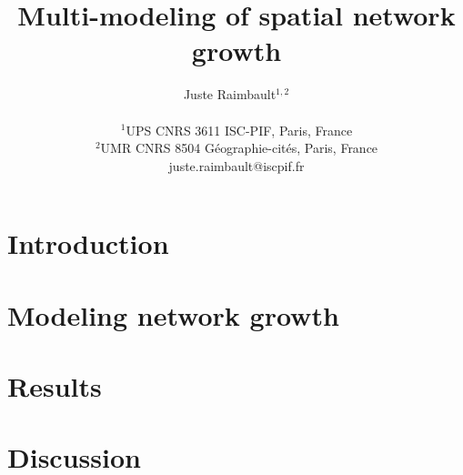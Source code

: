 \documentclass[letterpaper]{article}
\title{Multi-modeling of spatial network growth}
\author{Juste Raimbault$^{1,2}$\\
\mbox{}\\
$^1$UPS CNRS 3611 ISC-PIF, Paris, France \\
$^2$UMR CNRS 8504 G{\'e}ographie-cit{\'e}s, Paris, France \\
juste.raimbault@iscpif.fr} %
\begin{document}
\maketitle

\begin{abstract}

\end{abstract}

\section{Introduction}



\section{Modeling network growth}



\section{Results}




\section{Discussion}






\footnotesize

\end{document}
